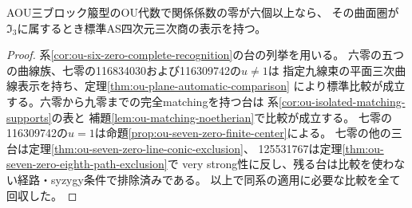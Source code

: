 \begin{corollary}[六個以上の零係数における比較仮定の除去]
\label{cor:ou-six-zero-automatic}
AOU三ブロック箙型のOU代数で関係係数の零が六個以上なら、
その曲面圏が$\mathfrak I_3$に属するとき標準AS四次元三次商の表示を持つ。
\end{corollary}
\begin{proof}
系\ref{cor:ou-six-zero-complete-recognition}の台の列挙を用いる。
六零の五つの曲線族、七零の116834030および116309742の$u\ne1$は
指定九線束の平面三次曲線表示を持ち、定理\ref{thm:ou-plane-automatic-comparison}
により標準比較が成立する。六零から九零までの完全matchingを持つ台は
系\ref{cor:ou-isolated-matching-supports}の表と
補題\ref{lem:ou-matching-noetherian}で比較が成立する。
七零の116309742の$u=1$は命題\ref{prop:ou-seven-zero-finite-center}による。
七零の他の三台は定理\ref{thm:ou-seven-zero-line-conic-exclusion}、
125531767は定理\ref{thm:ou-seven-zero-eighth-path-exclusion}で
very strong性に反し、残る台は比較を使わない経路・syzygy条件で排除済みである。
以上で同系の適用に必要な比較を全て回収した。
\end{proof}

